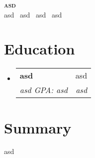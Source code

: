 \documentclass[letterpaper,11pt]{article}
\newcommand{\resumeSubheading}[4]{
  \vspace{-2pt}\item
    \begin{tabularx}{\textwidth}{Xr}
      \textbf{#1} & #2 \\
      \textit{\small#3} & \textit{\small #4} \\
    \end{tabularx}\vspace{-6pt}
}
\newcommand{\resumeSubHeadingListStart}{
  \begin{itemize}[leftmargin=0.15in, label={}, itemsep=3pt, parsep=0pt, topsep=0pt]
}
\newcommand{\resumeSubHeadingListEnd}{\end{itemize}}
\begin{document}
\begin{center}
    \textbf{\Huge \scshape asd} \\ \vspace{1pt}
    \small
            asd
         \textbar\ 
            asd
         \textbar\ 
            asd
         \textbar\ 
            asd
         \textbar\ 
\end{center}

      \section{Education}
      \resumeSubHeadingListStart
          \resumeSubheading
            { asd }{ asd }
            { asd  GPA: asd }{ asd }
      \resumeSubHeadingListEnd
      \section{Summary}
      asd

\end{document}
